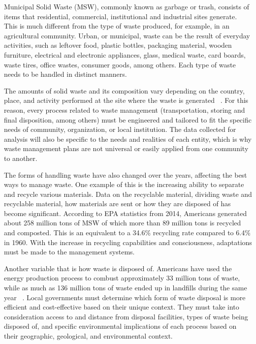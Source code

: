 \documentclass[sigconf]{acmart}
\begin{document}
Municipal Solid Waste (MSW), commonly known as garbage or trash, consists of items that residential, commercial, institutional and industrial sites generate. This is much different from the type of waste produced, for example, in an agricultural community.  Urban, or municipal, waste can be the result of everyday activities, such as leftover food, plastic bottles, packaging material, wooden furniture, electrical and electronic appliances, glass, medical waste, card boards, waste tires, office wastes, consumer goods, among others.  Each type of waste needs to be handled in distinct manners.  

The amounts of solid waste and its composition vary depending on the country, place, and activity performed at the site where the waste is generated ~\cite{chandrappa2012}. For this reason, every process related to waste management (transportation, storing and final disposition, among others) must be engineered and tailored to fit the specific needs of community, organization, or local institution.  The data collected for analysis will also be specific to the needs and realities of each entity, which is why waste management plans are not universal or easily applied from one community to another.  

The forms of handling waste have also changed over the years, affecting the best ways to manage waste.  One example of this is the increasing ability to separate and recycle various materials. Data on the recyclable material, dividing waste and recyclable material,  how materials are sent or how they are disposed of has become significant.  According to EPA statistics from 2014, Americans generated about 258 million tons of MSW of which more than 89 million tons is recycled and composted. This is an equivalent to a 34.6\% recycling rate compared to 6.4\% in 1960. With the increase in recycling capabilities and consciousness, adaptations must be made to the management systems.  

Another variable that is how waste is disposed of.  Americans have used the energy production process to combust approximately 33 million tons of waste,  while as much as 136 million tons of waste ended up in landfills during the same year ~\cite{epa2014}.  Local governments must determine which form of waste disposal is more efficient and cost-effective based on their unique context.  They must take into consideration access to and distance from disposal facilities, types of waste being disposed of, and specific environmental implications of each process based on their geographic, geological, and environmental context.  
\end{document}

